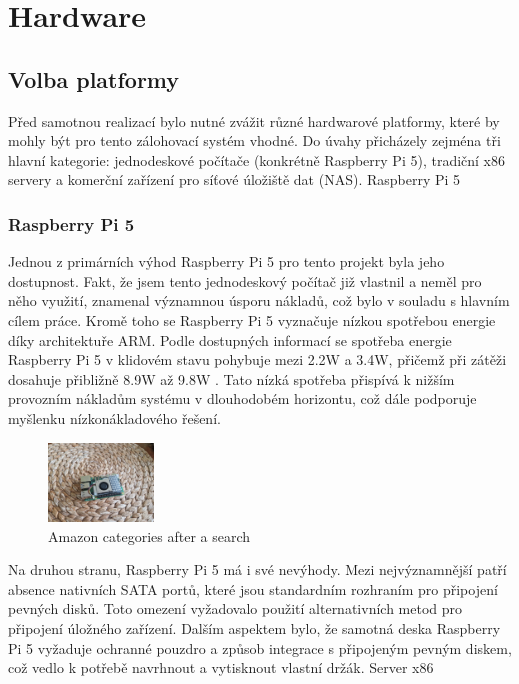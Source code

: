 \documentclass[a4paper,12pt, oneside]{book}
\begin{document}
\chapter{Hardware}
\section{Volba platformy}

Před samotnou realizací bylo nutné zvážit různé hardwarové platformy, které by
mohly být pro tento zálohovací systém vhodné. Do úvahy přicházely zejména tři
hlavní kategorie: jednodeskové počítače (konkrétně Raspberry Pi 5), tradiční x86
servery a komerční zařízení pro síťové úložiště dat (NAS). Raspberry Pi 5

\subsection{Raspberry Pi 5}

Jednou z primárních výhod Raspberry Pi 5 pro tento projekt byla jeho dostupnost.
Fakt, že jsem tento jednodeskový počítač již vlastnil a neměl pro něho využití,
znamenal významnou úsporu nákladů, což bylo v souladu s hlavním cílem
práce. Kromě toho se Raspberry Pi 5 vyznačuje nízkou spotřebou energie díky
architektuře ARM. Podle dostupných informací se spotřeba energie Raspberry Pi 5
v klidovém stavu pohybuje mezi 2.2W a 3.4W, přičemž při zátěži dosahuje
přibližně 8.9W až 9.8W . Tato nízká spotřeba přispívá k nižším provozním
nákladům systému v dlouhodobém horizontu, což dále podporuje myšlenku
nízkonákladového řešení.  

\begin{figure}
	\centering
	\includegraphics[width=0.25\textwidth]{img/rpi5-active-cooler.jpg}
	\caption{Amazon categories after a search}
\end{figure}

Na druhou stranu, Raspberry Pi 5 má i své nevýhody. Mezi nejvýznamnější patří
absence nativních SATA portů, které jsou standardním rozhraním pro připojení
pevných disků. Toto omezení vyžadovalo použití alternativních metod pro
připojení úložného zařízení. Dalším aspektem bylo, že samotná deska Raspberry Pi
5 vyžaduje ochranné pouzdro a způsob integrace s připojeným pevným diskem, což
vedlo k potřebě navrhnout a vytisknout vlastní držák. Server x86
\end{document}
